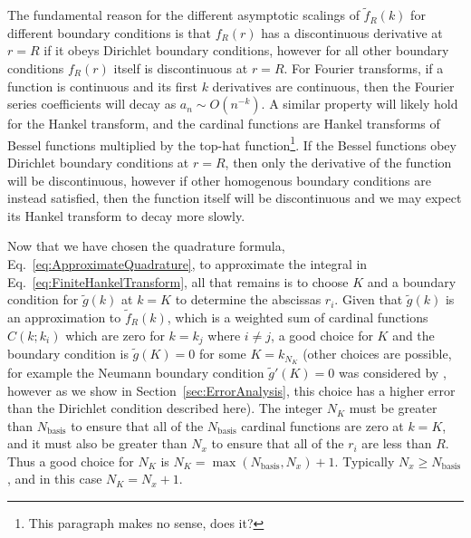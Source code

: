 \documentclass[aip,amsmath,amssymb,reprint,twocolumn]{revtex4-1}
\newcommand{\Nbasis}{{N_{\text{basis}}}}
\newcommand{\Nx}{{N_{x}}}
\begin{document}
The fundamental reason for the different asymptotic scalings of $\tilde{f}_R(k)$ for different boundary conditions is that $f_R(r)$ has a discontinuous derivative at $r=R$ if it obeys Dirichlet boundary conditions, however for all other boundary conditions $f_R(r)$ itself is discontinuous at $r=R$.  For Fourier transforms, if a function is continuous and its first $k$ derivatives are continuous, then the Fourier series coefficients will decay as $a_n \sim O(n^{-k})$.  A similar property will likely hold for the Hankel transform, and the cardinal functions are Hankel transforms of Bessel functions multiplied by the top-hat function\footnote{This paragraph makes no sense, does it?}.  If the Bessel functions obey Dirichlet boundary conditions at $r=R$, then only the derivative of the function will be discontinuous, however if other homogenous boundary conditions are instead satisfied, then the function itself will be discontinuous and we may expect its Hankel transform to decay more slowly.

Now that we have chosen the quadrature formula, Eq.~\eqref{eq:ApproximateQuadrature}, to approximate the integral in Eq.~\eqref{eq:FiniteHankelTransform}, all that remains is to choose $K$ and a boundary condition for $\tilde{g}(k)$ at $k=K$ to determine the abscissas $r_i$.  Given that $\tilde{g}(k)$ is an approximation to $\tilde{f}_R(k)$, which is a weighted sum of cardinal functions $C(k; k_i)$ which are zero for $k=k_j$ where $i \neq j$, a good choice for $K$ and the boundary condition is $\tilde{g}(K)=0$ for some $K=k_{N_K}$ (other choices are possible, for example the Neumann boundary condition $\tilde{g}'(K)= 0$ was considered by \citep{Kai-Ming:2009}, however as we show in Section~\ref{sec:ErrorAnalysis}, this choice has a higher error than the Dirichlet condition described here).  The integer $N_K$ must be greater than $\Nbasis$ to ensure that all of the $\Nbasis$ cardinal functions are zero at $k=K$, and it must also be greater than $\Nx$ to ensure that all of the $r_i$ are less than $R$.  Thus a good choice for $N_K$ is $N_K = \max(\Nbasis,\Nx)+1$.  Typically $\Nx \ge \Nbasis$, and in this case $N_K = \Nx+1$.
\end{document}
